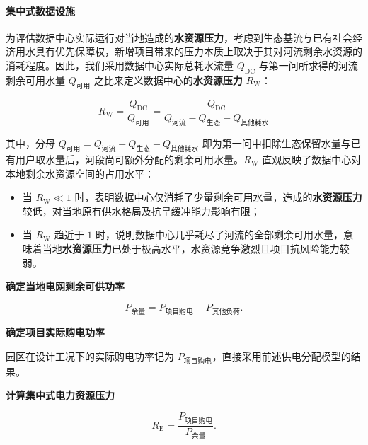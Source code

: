 \paragraph{集中式数据设施}\label{sec:q2-p-cen}


为评估数据中心实际运行对当地造成的\textbf{水资源压力}，考虑到生态基流与已有社会经济用水具有优先保障权，新增项目带来的压力本质上取决于其对河流剩余水资源的消耗程度。因此，我们采用数据中心实际总耗水流量 $Q_{\mathrm{DC}}$ 与第一问所求得的河流剩余可用水量 $Q_{\text{可用}}$ 之比来定义数据中心的\textbf{水资源压力} $R_{\mathrm{W}}$：

\begin{equation}\label{eq:q2-rw}
R_{\mathrm{W}} = \frac{Q_{\mathrm{DC}}}{Q_{\text{可用}}} = \frac{Q_{\mathrm{DC}}}{Q_{\text{河流}} - Q_{\text{生态}} - Q_{\text{其他耗水}}}
\end{equation}

其中，分母 $Q_{\text{可用}} = Q_{\text{河流}} - Q_{\text{生态}} - Q_{\text{其他耗水}}$ 即为第一问中扣除生态保留水量与已有用户取水量后，河段尚可额外分配的剩余可用水量。$R_{\mathrm{W}}$ 直观反映了数据中心对本地剩余水资源空间的占用水平：

\begin{itemize}
\item 当 $R_{\mathrm{W}} \ll 1$ 时，表明数据中心仅消耗了少量剩余可用水量，造成的\textbf{水资源压力}较低，对当地原有供水格局及抗旱缓冲能力影响有限；
\item 当 $R_{\mathrm{W}}$ 趋近于 $1$ 时，说明数据中心几乎耗尽了河流的全部剩余可用水量，意味着当地\textbf{水资源压力}已处于极高水平，水资源竞争激烈且项目抗风险能力较弱。
\end{itemize}


\textbf{确定当地电网剩余可供功率}

\begin{equation}\label{eq:q2-reserve}
P_{\text{余量}}
=P_{\text{项目购电}}-P_{\text{其他负荷}}.
\end{equation}

\textbf{确定项目实际购电功率}

园区在设计工况下的实际购电功率记为 $P_{\text{项目购电}}$，直接采用前述供电分配模型的结果。

\textbf{计算集中式电力资源压力}

\begin{equation}\label{eq:q2-re}
R_{\mathrm{E}}
=\frac{P_{\text{项目购电}}}{P_{\text{余量}}}.
\end{equation}

